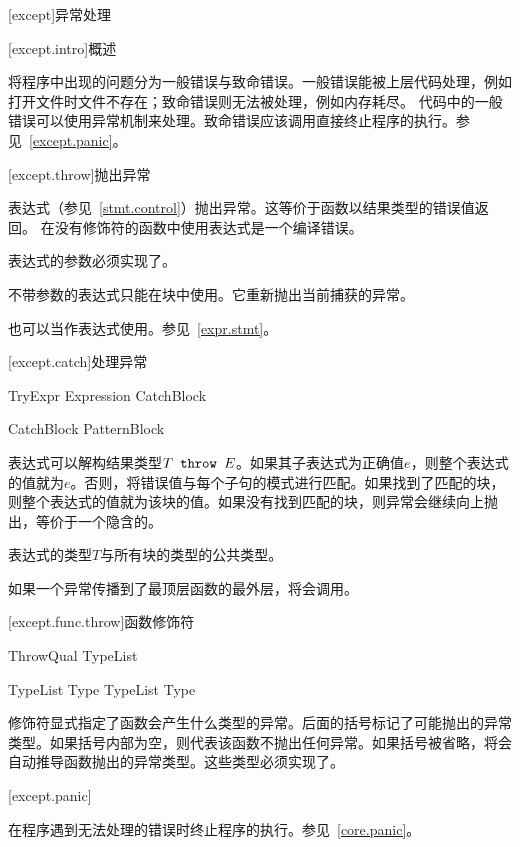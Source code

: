 
[except]{异常处理}

[except.intro]{概述}

\pnum
\X 将程序中出现的问题分为一般错误与致命错误。一般错误能被上层代码处理，例如打开文件时文件不存在；致命错误则无法被处理，例如内存耗尽。
代码中的一般错误可以使用异常机制来处理。致命错误应该调用直接终止程序的执行。参见~\ref{except.panic}。

[except.throw]{抛出异常}

\pnum
{}表达式（参见~\ref{stmt.control}）抛出异常。这等价于函数以结果类型的错误值返回。
在没有修饰符的函数中使用表达式是一个编译错误。

\pnum
{}表达式的参数必须实现了。

\pnum
不带参数的表达式只能在块中使用。它重新抛出当前捕获的异常。

\pnum
{}也可以当作表达式使用。参见~\ref{expr.stmt}。

[except.catch]{处理异常}

\begin{bnf}{TryExpr}
     Expression CatchBlock\bnfs
\end{bnf}

\begin{bnf}{CatchBlock}
     Pattern\bnfq Block
\end{bnf}

\pnum
{}表达式可以解构结果类型$T\texttt{ throw }E$。如果其子表达式为正确值$e$，则整个表达式的值就为$e$。否则，将错误值与每个子句的模式进行匹配。如果找到了匹配的块，则整个表达式的值就为该块的值。如果没有找到匹配的块，则异常会继续向上抛出，等价于一个隐含的。

\pnum
{}表达式的类型$T$与所有块的类型的公共类型。

\pnum
如果一个异常传播到了最顶层函数的最外层，将会调用。

[except.func.throw]{函数修饰符}

\begin{bnf}{ThrowQual}
     \terminal{(} TypeList\bnfs \terminal{)} \br
\end{bnf}

\begin{bnf}{TypeList}
    Type \br
    TypeList \terminal{,} Type
\end{bnf}

\pnum
{}修饰符显式指定了函数会产生什么类型的异常。后面的括号标记了可能抛出的异常类型。如果括号内部为空，则代表该函数不抛出任何异常。如果括号被省略，将会自动推导函数抛出的异常类型。这些类型必须实现了。

[except.panic]{}

\pnum
{}在程序遇到无法处理的错误时终止程序的执行。参见~\ref{core.panic}。